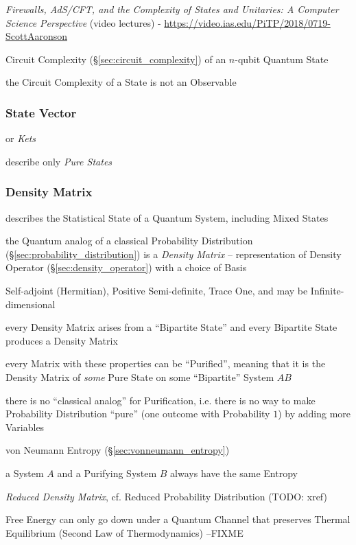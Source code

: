\emph{Firewalls, AdS/CFT, and the Complexity of States and Unitaries: A Computer
  Science Perspective}
(video lectures)
-
\url{https://video.ias.edu/PiTP/2018/0719-ScottAaronson}

Circuit Complexity (\S\ref{sec:circuit_complexity}) of an $n$-qubit Quantum
State

the Circuit Complexity of a State is not an Observable



\subsubsection{State Vector}\label{sec:state_vector}

or \emph{Kets}

describe only \emph{Pure States}



\subsubsection{Density Matrix}\label{sec:density_matrix}

describes the Statistical State of a Quantum System, including Mixed States

the Quantum analog of a classical Probability Distribution
(\S\ref{sec:probability_distribution}) is a \emph{Density Matrix} --
representation of Density Operator (\S\ref{sec:density_operator}) with a choice
of Basis

Self-adjoint (Hermitian), Positive Semi-definite, Trace One, and may be
Infinite-dimensional

every Density Matrix arises from a ``Bipartite State'' and every Bipartite State
produces a Density Matrix

every Matrix with these properties can be ``Purified'', meaning that it is the
Density Matrix of \emph{some} Pure State on some ``Bipartite'' System $AB$

there is no ``classical analog'' for Purification, i.e. there is no way to make
Probability Distribution ``pure'' (one outcome with Probability $1$) by adding
more Variables

von Neumann Entropy (\S\ref{sec:vonneumann_entropy})

a System $A$ and a Purifying System $B$ always have the same Entropy

\emph{Reduced Density Matrix}, cf. Reduced Probability Distribution (TODO: xref)

Free Energy can only go down under a Quantum Channel that preserves Thermal
Equilibrium (Second Law of Thermodynamics)
--FIXME



